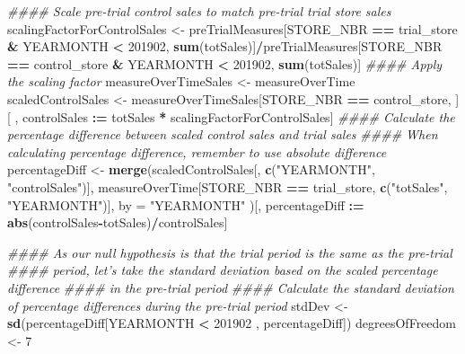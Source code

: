\documentclass[
]{article}
\newenvironment{Shaded}{\begin{snugshade}}{\end{snugshade}}
\newcommand{\CommentTok}[1]{\textcolor[rgb]{0.56,0.35,0.01}{\textit{#1}}}
\newcommand{\DataTypeTok}[1]{\textcolor[rgb]{0.13,0.29,0.53}{#1}}
\newcommand{\DecValTok}[1]{\textcolor[rgb]{0.00,0.00,0.81}{#1}}
\newcommand{\ErrorTok}[1]{\textcolor[rgb]{0.64,0.00,0.00}{\textbf{#1}}}
\newcommand{\KeywordTok}[1]{\textcolor[rgb]{0.13,0.29,0.53}{\textbf{#1}}}
\newcommand{\NormalTok}[1]{#1}
\newcommand{\OperatorTok}[1]{\textcolor[rgb]{0.81,0.36,0.00}{\textbf{#1}}}
\newcommand{\StringTok}[1]{\textcolor[rgb]{0.31,0.60,0.02}{#1}}
\begin{document}
\begin{Shaded}
\begin{Highlighting}[]
\CommentTok{#### Scale pre-trial control sales to match pre-trial trial store sales}
\NormalTok{scalingFactorForControlSales <-}\StringTok{ }\NormalTok{preTrialMeasures[STORE_NBR }\OperatorTok{==}\StringTok{ }\NormalTok{trial_store }\OperatorTok{&}
\NormalTok{YEARMONTH }\OperatorTok{<}\StringTok{ }\DecValTok{201902}\NormalTok{, }\KeywordTok{sum}\NormalTok{(totSales)]}\OperatorTok{/}\NormalTok{preTrialMeasures[STORE_NBR }\OperatorTok{==}\StringTok{ }\NormalTok{control_store }\OperatorTok{&}
\NormalTok{YEARMONTH }\OperatorTok{<}\StringTok{ }\DecValTok{201902}\NormalTok{, }\KeywordTok{sum}\NormalTok{(totSales)]}
\CommentTok{#### Apply the scaling factor}
\NormalTok{measureOverTimeSales <-}\StringTok{ }\NormalTok{measureOverTime}
\NormalTok{scaledControlSales <-}\StringTok{ }\NormalTok{measureOverTimeSales[STORE_NBR }\OperatorTok{==}\StringTok{ }\NormalTok{control_store, ][ ,}
\NormalTok{controlSales }\OperatorTok{:}\ErrorTok{=}\StringTok{ }\NormalTok{totSales }\OperatorTok{*}\StringTok{ }\NormalTok{scalingFactorForControlSales]}
\CommentTok{#### Calculate the percentage difference between scaled control sales and trial sales}
\CommentTok{#### When calculating percentage difference, remember to use absolute difference}
\NormalTok{percentageDiff <-}\StringTok{ }\KeywordTok{merge}\NormalTok{(scaledControlSales[, }\KeywordTok{c}\NormalTok{(}\StringTok{"YEARMONTH"}\NormalTok{, }\StringTok{"controlSales"}\NormalTok{)],}
\NormalTok{measureOverTime[STORE_NBR }\OperatorTok{==}\StringTok{ }\NormalTok{trial_store, }\KeywordTok{c}\NormalTok{(}\StringTok{"totSales"}\NormalTok{, }\StringTok{"YEARMONTH"}\NormalTok{)],}
\DataTypeTok{by =} \StringTok{"YEARMONTH"}
\NormalTok{)[, percentageDiff }\OperatorTok{:}\ErrorTok{=}\StringTok{ }\KeywordTok{abs}\NormalTok{(controlSales}\OperatorTok{-}\NormalTok{totSales)}\OperatorTok{/}\NormalTok{controlSales]}

\CommentTok{#### As our null hypothesis is that the trial period is the same as the pre-trial}
\CommentTok{#### period, let's take the standard deviation based on the scaled percentage difference}
\CommentTok{#### in the pre-trial period}
\CommentTok{#### Calculate the standard deviation of percentage differences during the pre-trial period}
\NormalTok{stdDev <-}\StringTok{ }\KeywordTok{sd}\NormalTok{(percentageDiff[YEARMONTH }\OperatorTok{<}\StringTok{ }\DecValTok{201902}\NormalTok{ , percentageDiff])}
\NormalTok{degreesOfFreedom <-}\StringTok{ }\DecValTok{7}


\end{Highlighting}
\end{Shaded}
\end{document}
